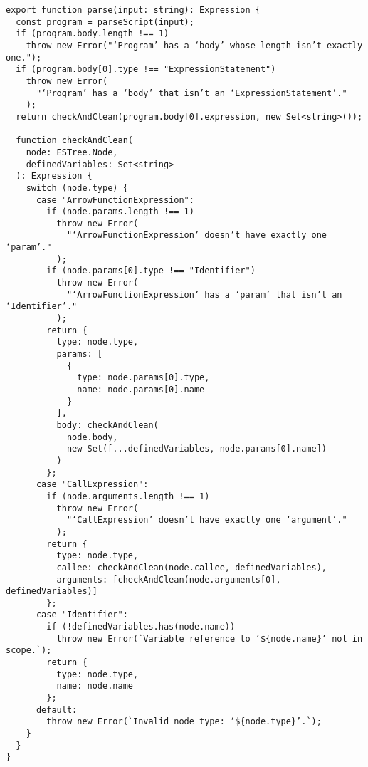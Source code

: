 \documentclass[12pt, oneside]{book}
\begin{document}
\begin{verbatim}
export function parse(input: string): Expression {
  const program = parseScript(input);
  if (program.body.length !== 1)
    throw new Error("‘Program’ has a ‘body’ whose length isn’t exactly one.");
  if (program.body[0].type !== "ExpressionStatement")
    throw new Error(
      "‘Program’ has a ‘body’ that isn’t an ‘ExpressionStatement’."
    );
  return checkAndClean(program.body[0].expression, new Set<string>());

  function checkAndClean(
    node: ESTree.Node,
    definedVariables: Set<string>
  ): Expression {
    switch (node.type) {
      case "ArrowFunctionExpression":
        if (node.params.length !== 1)
          throw new Error(
            "‘ArrowFunctionExpression’ doesn’t have exactly one ‘param’."
          );
        if (node.params[0].type !== "Identifier")
          throw new Error(
            "‘ArrowFunctionExpression’ has a ‘param’ that isn’t an ‘Identifier’."
          );
        return {
          type: node.type,
          params: [
            {
              type: node.params[0].type,
              name: node.params[0].name
            }
          ],
          body: checkAndClean(
            node.body,
            new Set([...definedVariables, node.params[0].name])
          )
        };
      case "CallExpression":
        if (node.arguments.length !== 1)
          throw new Error(
            "‘CallExpression’ doesn’t have exactly one ‘argument’."
          );
        return {
          type: node.type,
          callee: checkAndClean(node.callee, definedVariables),
          arguments: [checkAndClean(node.arguments[0], definedVariables)]
        };
      case "Identifier":
        if (!definedVariables.has(node.name))
          throw new Error(`Variable reference to ‘${node.name}’ not in scope.`);
        return {
          type: node.type,
          name: node.name
        };
      default:
        throw new Error(`Invalid node type: ‘${node.type}’.`);
    }
  }
}
\end{verbatim}
\end{document}
